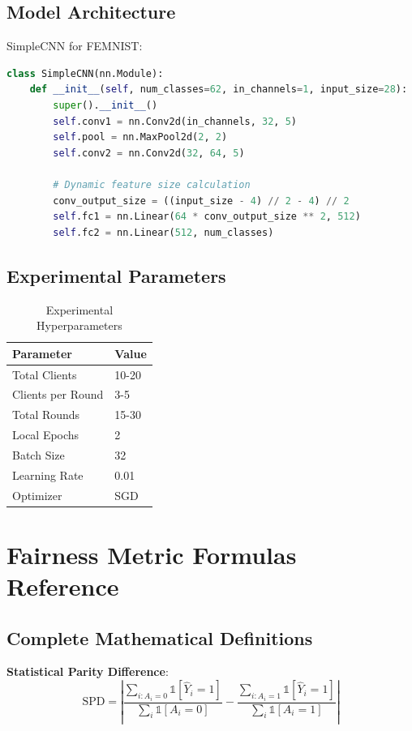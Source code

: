 \documentclass{article}
\begin{document}
\subsection{Model Architecture}

SimpleCNN for FEMNIST:
\begin{lstlisting}[language=Python]
class SimpleCNN(nn.Module):
    def __init__(self, num_classes=62, in_channels=1, input_size=28):
        super().__init__()
        self.conv1 = nn.Conv2d(in_channels, 32, 5)
        self.pool = nn.MaxPool2d(2, 2)
        self.conv2 = nn.Conv2d(32, 64, 5)
        
        # Dynamic feature size calculation
        conv_output_size = ((input_size - 4) // 2 - 4) // 2
        self.fc1 = nn.Linear(64 * conv_output_size ** 2, 512)
        self.fc2 = nn.Linear(512, num_classes)
\end{lstlisting}

\subsection{Experimental Parameters}

\begin{table}[t]
\centering
\begin{tabular}{@{}ll@{}}
\toprule
\textbf{Parameter} & \textbf{Value} \\
\midrule
Total Clients & 10-20 \\
Clients per Round & 3-5 \\
Total Rounds & 15-30 \\
Local Epochs & 2 \\
Batch Size & 32 \\
Learning Rate & 0.01 \\
Optimizer & SGD \\
\bottomrule
\end{tabular}
\caption{Experimental Hyperparameters}
\label{tab:hyperparams}
\end{table}

\section{Fairness Metric Formulas Reference}

\subsection{Complete Mathematical Definitions}

\textbf{Statistical Parity Difference}:
\begin{equation}
\text{SPD} = \left| \frac{\sum_{i:A_i=0} \mathbb{1}[\hat{Y}_i=1]}{\sum_{i} \mathbb{1}[A_i=0]} - \frac{\sum_{i:A_i=1} \mathbb{1}[\hat{Y}_i=1]}{\sum_{i} \mathbb{1}[A_i=1]} \right|
\end{equation}
\end{document}
